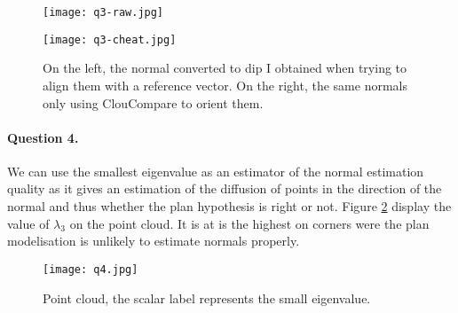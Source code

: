 \documentclass[french]{article}
\begin{document}
\begin{figure}[h]
	\centering
	\begin{minipage}{0.49\linewidth}
		\texttt{[image: q3-raw.jpg]}
	\end{minipage}\hfill
	\begin{minipage}{0.49\linewidth}
		\texttt{[image: q3-cheat.jpg]}
	\end{minipage}
	\caption{On the left, the normal converted to dip I obtained when trying to align them with a reference vector. On the right, the same normals only using ClouCompare to orient them.}
	\label{fig:q3}
\end{figure}


\paragraph{Question 4.} We can use the smallest eigenvalue as an estimator of the normal estimation quality as it gives an estimation of the diffusion of points in the direction of the normal and thus whether the plan hypothesis is right or not. Figure \ref{fig:q4} display the value of $\lambda_3$ on the point cloud. It is at is the highest on corners were the plan modelisation  is unlikely to estimate normals properly.

\begin{figure}[h]
	\centering
	\texttt{[image: q4.jpg]}
	\caption{Point cloud, the scalar label represents the small eigenvalue.}
	\label{fig:q4}
\end{figure}
\end{document}
